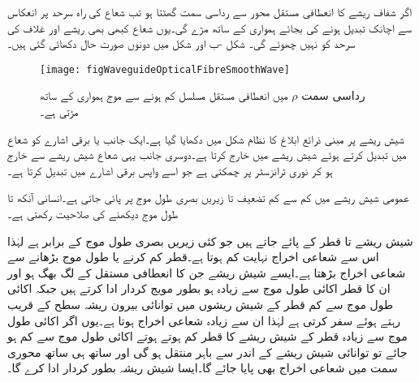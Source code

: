 اگر شفاف ریشے کا  انعطافی مستقل محور سے رداسی  سمت گھٹتا ہو تب شعاع کی راہ سرحد پر انعکاس سے اچانک تبدیل ہونے کی بجائے ہمواری کے ساتھ مڑے گی۔یوں شعاع کبھی بھی ریشے اور  غلاف کی سرحد کو نہیں چھوئے گی۔  شکل -ب اور شکل  میں دونوں صورت حال دکھائی گئی ہیں۔  

\begin{figure}
\centering
\texttt{[image: figWaveguideOpticalFibreSmoothWave]}
\caption{رداسی سمت $\rho$ میں  انعطافی مستقل مسلسل کم ہونے سے موج ہمواری کے ساتھ مڑتی ہے۔}
\label{شکل_مویج_شیش_ریشہ_ہموار_موج}
\end{figure}

شیش ریشے پر مبنی ذرائع ابلاغ کا نظام شکل میں دکھایا گیا ہے۔ایک جانب  یا  برقی اشارے کو شعاع میں تبدیل کرتے ہوئے شیش ریشے میں خارج کرتا ہے۔دوسری جانب یہی شعاع شیش ریشے سے خارج ہو کر نوری ٹرانزسٹر پر چمکتی ہے جو اسے واپس برقی اشارے میں تبدیل کرتا ہے۔ 

عمومی شیش ریشے  میں کم سے کم تضعیف  تا  زیریں بصری طول موج پر پائی جاتی ہے۔انسانی آنکھ  تا  طول موج دیکھنے کی صلاحیت رکھتی ہے۔

شیش ریشے   تا  قطر کے پائے جاتے ہیں جو کئی زیریں بصری طول موج کے برابر ہے لہٰذا اس سے شعاعی اخراج نہایت کم ہوتا ہے۔قطر کم کرنے یا طول موج بڑھانے سے شعاعی اخراج بڑھتا ہے۔ایسے شیش ریشے جن کا  انعطافی مستقل  کے لگ بھگ ہو اور ان کا قطر اکائی طول موج سے زیادہ ہو بطور مویج کردار ادا کرتے ہیں جبکہ اکائی طول موج سے کم قطر  کے شیش ریشوں میں توانائی بیرون ریشہ سطح کے قریب رہتے ہوئے سفر کرتی ہے لہٰذا ان سے زیادہ شعاعی اخراج ہوتا ہے۔یوں اگر اکائی طول موج  سے زیادہ قطر کے شیش ریشے کا قطر کم ہوتے ہوتے اکائی طول موج سے کم ہو جائے تو توانائی شیش ریشے کے اندر سے  باہر  منتقل ہو گی  اور ساتھ ہی ساتھ محوری سمت میں شعاعی اخراج بھی پایا جائے گا۔ایسا شیش ریشہ بطور   کردار ادا کرے  گا۔

